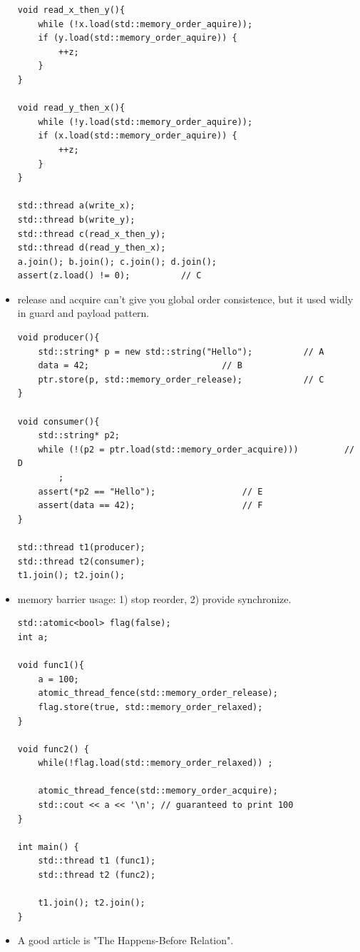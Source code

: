 \documentclass[a4paper,11pt,twoside]{book}
\begin{document}
\begin{itemize}
\begin{lstlisting}
void read_x_then_y(){
    while (!x.load(std::memory_order_aquire));
    if (y.load(std::memory_order_aquire)) {
        ++z;
    }
}
 
void read_y_then_x(){
    while (!y.load(std::memory_order_aquire));
    if (x.load(std::memory_order_aquire)) {
        ++z;
    }
}
 
std::thread a(write_x);
std::thread b(write_y);
std::thread c(read_x_then_y);
std::thread d(read_y_then_x);
a.join(); b.join(); c.join(); d.join();
assert(z.load() != 0);			// C
\end{lstlisting}

\item release and acquire can't give you global order consistence, but it used widly in guard and payload pattern.

\begin{lstlisting}
void producer(){
    std::string* p = new std::string("Hello");			// A
    data = 42;							// B
    ptr.store(p, std::memory_order_release);			// C
}
 
void consumer(){
    std::string* p2;
    while (!(p2 = ptr.load(std::memory_order_acquire)))	        // D
        ;
    assert(*p2 == "Hello");					// E
    assert(data == 42);						// F
}
 
std::thread t1(producer);
std::thread t2(consumer);
t1.join(); t2.join();
\end{lstlisting}
\item memory barrier usage: 1) stop reorder, 2) provide synchronize.
\begin{lstlisting}
std::atomic<bool> flag(false);
int a;

void func1(){
    a = 100;
    atomic_thread_fence(std::memory_order_release);
    flag.store(true, std::memory_order_relaxed);
}

void func2() {
    while(!flag.load(std::memory_order_relaxed)) ;

    atomic_thread_fence(std::memory_order_acquire);
    std::cout << a << '\n'; // guaranteed to print 100
}

int main() {
    std::thread t1 (func1);
    std::thread t2 (func2);

    t1.join(); t2.join();
}
\end{lstlisting}
	
		\item A good article is "The Happens-Before Relation".
\end{itemize}
\end{document}
